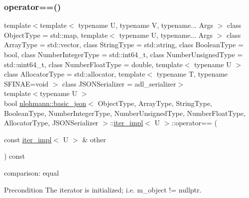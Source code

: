 \subsubsection{\texorpdfstring{operator==()}{operator==()}}
{\footnotesize\ttfamily template$<$template$<$ typename U, typename V, typename... Args $>$ class Object\+Type = std\+::map, template$<$ typename U, typename... Args $>$ class Array\+Type = std\+::vector, class String\+Type  = std\+::string, class Boolean\+Type  = bool, class Number\+Integer\+Type  = std\+::int64\+\_\+t, class Number\+Unsigned\+Type  = std\+::uint64\+\_\+t, class Number\+Float\+Type  = double, template$<$ typename U $>$ class Allocator\+Type = std\+::allocator, template$<$ typename T, typename S\+F\+I\+N\+A\+E=void $>$ class J\+S\+O\+N\+Serializer = adl\+\_\+serializer$>$ \\
template$<$typename U $>$ \\
bool \hyperlink{classnlohmann_1_1basic__json}{nlohmann\+::basic\+\_\+json}$<$ Object\+Type, Array\+Type, String\+Type, Boolean\+Type, Number\+Integer\+Type, Number\+Unsigned\+Type, Number\+Float\+Type, Allocator\+Type, J\+S\+O\+N\+Serializer $>$\+::\hyperlink{classnlohmann_1_1basic__json_1_1iter__impl}{iter\+\_\+impl}$<$ U $>$\+::operator== (\begin{DoxyParamCaption}\item[{const \hyperlink{classnlohmann_1_1basic__json_1_1iter__impl}{iter\+\_\+impl}$<$ U $>$ \&}]{other }\end{DoxyParamCaption}) const\hspace{0.3cm}{\ttfamily [inline]}}



comparison\+: equal 

\begin{DoxyPrecond}{Precondition}
The iterator is initialized; i.\+e. {\ttfamily m\+\_\+object != nullptr}. 
\end{DoxyPrecond}
\mbox{\label{classnlohmann_1_1basic__json_1_1iter__impl_ae6c8e672ff064e0b92073b4dd939ada6}} 
